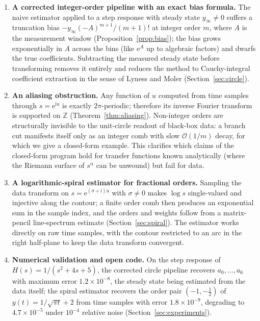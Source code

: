 \documentclass[11pt, a4paper]{article}
\theoremstyle{definition}
\theoremstyle{remark}
\newcommand{\Z}{\mathbb{Z}}
\newcommand{\ii}{\mathrm{i}}
\newcommand{\ee}{\mathrm{e}}
\begin{document}
\begin{enumerate}
\item \textbf{A corrected integer-order pipeline with an exact bias
formula.} The naive estimator applied to a step response with steady state
$y_\infty\neq0$ suffers a truncation bias
$-y_\infty(-A)^{m+1}/(m+1)!$ at integer order $m$, where $A$ is the
measurement window (Proposition~\ref{prop:bias}); the bias grows
exponentially in $A$ across the bins (like $\ee^{A}$ up to algebraic
factors) and dwarfs the true coefficients. Subtracting the measured steady
state before transforming removes it entirely and reduces the method to
Cauchy-integral coefficient extraction in the sense of Lyness and Moler
\cite{LynessMoler1967} (Section~\ref{sec:circle}).

\item \textbf{An aliasing obstruction.} Any function of $u$ computed from
time samples through $s=\ee^{\ii u}$ is exactly $2\pi$-periodic; therefore
its inverse Fourier transform is supported on $\Z$
(Theorem~\ref{thm:aliasing}). Non-integer orders are structurally invisible
to the unit-circle readout of black-box data: a branch cut manifests itself
only as an integer comb with slow $\mathcal{O}(1/m)$ decay, for which we
give a closed-form example. This clarifies which claims of the closed-form
program hold for transfer functions known analytically (where the Riemann
surface of $s^{\alpha}$ can be unwound) but fail for data.

\item \textbf{A logarithmic-spiral estimator for fractional orders.}
Sampling the data transform on $s=\ee^{(\sigma+\ii)u}$ with $\sigma\neq0$
makes $\log s$ single-valued and injective along the contour; a finite
order comb then produces an exponential sum in the sample index, and the
orders and weights follow from a matrix-pencil line-spectrum estimate
\cite{HuaSarkar1990} (Section~\ref{sec:spiral}). The estimator works
directly on raw time samples, with the contour restricted to an arc in the
right half-plane to keep the data transform convergent.

\item \textbf{Numerical validation and open code.} On the step response of
$H(s)=1/(s^{2}+4s+5)$, the corrected circle pipeline recovers
$a_0,\dots,a_6$ with maximum error $1.2\times10^{-8}$, the steady state
being estimated from the data itself; the spiral estimator recovers the
order pair $(-1,-\tfrac12)$ of $y(t)=1/\sqrt{\pi t}+2$ from time samples
with error $1.8\times10^{-9}$, degrading to $4.7\times10^{-5}$ under
$10^{-4}$ relative noise (Section~\ref{sec:experiments}).


\end{enumerate}
\end{document}
